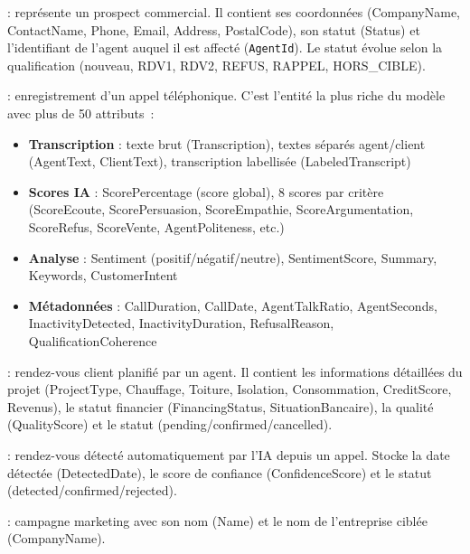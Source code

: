 \begin{description}[itemsep=4pt]
    \item[\textbf{Lead}] : représente un prospect commercial. Il contient ses coordonnées
    (CompanyName, ContactName, Phone, Email, Address, PostalCode), son statut (Status)
    et l'identifiant de l'agent auquel il est affecté (\texttt{AgentId}). Le statut
    évolue selon la qualification (nouveau, RDV1, RDV2, REFUS, RAPPEL, HORS\_CIBLE).

    \item[\textbf{Call}] : enregistrement d'un appel téléphonique. C'est l'entité la plus
    riche du modèle avec plus de 50 attributs~:
    \begin{itemize}
        \item \textbf{Transcription} : texte brut (Transcription), textes séparés
        agent/client (AgentText, ClientText), transcription labellisée (LabeledTranscript)
        \item \textbf{Scores IA} : ScorePercentage (score global), 8 scores par critère
        (ScoreEcoute, ScorePersuasion, ScoreEmpathie, ScoreArgumentation, ScoreRefus,
        ScoreVente, AgentPoliteness, etc.)
        \item \textbf{Analyse} : Sentiment (positif/négatif/neutre), SentimentScore,
        Summary, Keywords, CustomerIntent
        \item \textbf{Métadonnées} : CallDuration, CallDate, AgentTalkRatio, AgentSeconds,
        InactivityDetected, InactivityDuration, RefusalReason, QualificationCoherence
    \end{itemize}

    \item[\textbf{CrmAppointment}] : rendez-vous client planifié par un agent. Il contient
    les informations détaillées du projet (ProjectType, Chauffage, Toiture, Isolation,
    Consommation, CreditScore, Revenus), le statut financier (FinancingStatus, SituationBancaire),
    la qualité (QualityScore) et le statut (pending/confirmed/cancelled).

    \item[\textbf{Appointment}] : rendez-vous détecté automatiquement par l'IA depuis
    un appel. Stocke la date détectée (DetectedDate), le score de confiance
    (ConfidenceScore) et le statut (detected/confirmed/rejected).

    \item[\textbf{Campaign}] : campagne marketing avec son nom (Name) et le nom
    de l'entreprise ciblée (CompanyName).


\end{description}
